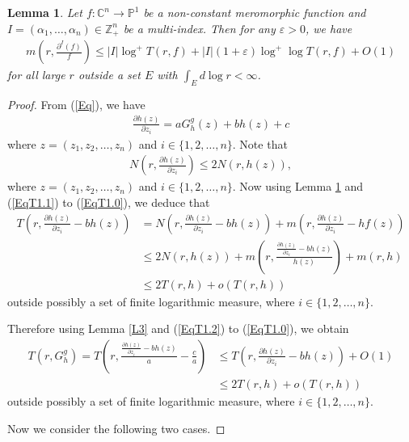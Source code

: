 \documentclass[10pt,a4paper]{amsart}
\newtheorem{lem}{Lemma}
\begin{document}
\begin{lem}\label{L2} \cite[Lemma 1.37]{Hu-Li-Yang-2003} Let $f:\mathbb{C}^n\to\mathbb{P}^1$ be a non-constant meromorphic function and $I=(\alpha_1,\ldots,\alpha_n)\in \mathbb{Z}^n_+$ be a multi-index. Then for any $\varepsilon>0$, we have
\begin{align*}
m\left(r,\frac{\partial^I(f)}{f}\right)\leq |I|\log^+T(r,f)+|I|(1+\varepsilon)\log^+\log T(r,f)+O(1)
\end{align*}
for all large $r$ outside a set $E$ with $\int_E d\log r<\infty$.
\end{lem}

\begin{proof} From (\ref{Eq}), we have
\begin{align}\label{EqT1.0}
\frac{\partial h(z)}{\partial z_i}=aG^g_h(z)+bh(z)+c
\end{align}
where $z=(z_1,z_2,\ldots,z_n)$ and $i\in\{1,2,\ldots,n\}$. 
Note that
\begin{align}\label{EqT1.1}
N\left(r,\frac{\partial h(z)}{\partial z_i}\right)\leq 2N(r,h(z)),
\end{align}
where $z=(z_1,z_2,\ldots,z_n)$ and $i\in\{1,2,\ldots,n\}$.
Now using Lemma \ref{L2} and (\ref{EqT1.1}) to (\ref{EqT1.0}), we deduce that
\begin{align}\label{EqT1.2}
T\left(r,\frac{\partial h(z)}{\partial z_i}-bh(z)\right)&=N\left(r,\frac{\partial h(z)}{\partial z_i}-bh(z)\right)+m\left(r,\frac{\partial h(z)}{\partial z_i}-hf(z)\right)\\&\leq 
2N(r,h(z))+m\left(r,\frac{\frac{\partial h(z)}{\partial z_i}-bh(z)}{h(z)}\right)+m(r,h)\nonumber\\&\leq
2T(r,h)+o(T(r,h))\nonumber
\end{align}
outside possibly a set of finite logarithmic measure, where $i\in\{1,2,\ldots,n\}$.

Therefore using Lemma \ref{L3} and (\ref{EqT1.2}) to (\ref{EqT1.0}), we obtain
\begin{align}\label{EqT1.3}
T(r,G^g_h)=T\left(r, \frac{\frac{\partial h(z)}{\partial z_i}-bh(z)}{a}-\frac{c}{a}\right)&\leq T\left(r,\frac{\partial h(z)}{\partial z_i}-bh(z)\right)+O(1)\\&\leq 
2T(r,h)+o(T(r,h))\nonumber
\end{align}
outside possibly a set of finite logarithmic measure, where $i\in\{1,2,\ldots,n\}$.


Now we consider the following two cases.\par


\end{proof}
\end{document}
